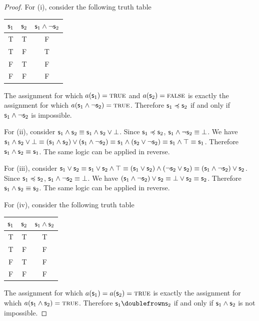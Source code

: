 \documentclass[11pt,letterpaper,fleqn]{memoir} %
\begin{document}
\begin{mathSection}
\begin{proof}
	For (i), consider the following truth table 
\begin{center}
	\begin{tabular}{c|c|c}
		$\mathsf{s}_1$ & $\mathsf{s}_2$ & $\mathsf{s}_1 \wedge \neg \mathsf{s}_2$\\
		\hline
		T & T & F \\
		T & F & T \\
		F & T & F \\
		F & F & F \\
	\end{tabular}
\end{center}
	The assignment for which $a(\mathsf{s}_1) = \textsc{true}$ and $a(\mathsf{s}_2) = \textsc{false}$ is exactly the assignment for which $a(\mathsf{s}_1 \wedge \neg \mathsf{s}_2) = \textsc{true}$. Therefore $\mathsf{s}_1 \preccurlyeq \mathsf{s}_2$ if and only if $\mathsf{s}_1 \wedge \neg \mathsf{s}_2$ is impossible.
	
	For (ii), consider $\mathsf{s}_1 \wedge \mathsf{s}_2 \equiv \mathsf{s}_1 \wedge \mathsf{s}_2 \vee \bot$. Since $\mathsf{s}_1 \preccurlyeq \mathsf{s}_2$, $\mathsf{s}_1 \wedge \neg \mathsf{s}_2 \equiv \bot$. We have $\mathsf{s}_1 \wedge \mathsf{s}_2 \vee \bot \equiv ( \mathsf{s}_1 \wedge \mathsf{s}_2 ) \vee (\mathsf{s}_1 \wedge \neg \mathsf{s}_2) \equiv \mathsf{s}_1 \wedge (\mathsf{s}_2 \vee \neg \mathsf{s}_2) \equiv \mathsf{s}_1 \wedge \top \equiv \mathsf{s}_1$. Therefore $\mathsf{s}_1 \wedge \mathsf{s}_2 \equiv \mathsf{s}_1$. The same logic can be applied in reverse.
	
	For (iii), consider $\mathsf{s}_1 \vee \mathsf{s}_2 \equiv \mathsf{s}_1 \vee \mathsf{s}_2 \wedge \top \equiv (\mathsf{s}_1 \vee \mathsf{s}_2) \wedge (\neg \mathsf{s}_2 \vee \mathsf{s}_2) \equiv (\mathsf{s}_1 \wedge \neg \mathsf{s}_2) \vee \mathsf{s}_2$. Since $\mathsf{s}_1 \preccurlyeq \mathsf{s}_2$, $\mathsf{s}_1 \wedge \neg \mathsf{s}_2 \equiv \bot$. We have $(\mathsf{s}_1 \wedge \neg \mathsf{s}_2) \vee \mathsf{s}_2 \equiv \bot \vee \mathsf{s}_2 \equiv \mathsf{s}_2$. Therefore $\mathsf{s}_1 \wedge \mathsf{s}_2 \equiv \mathsf{s}_2$. The same logic can be applied in reverse.
	
	For (iv), consider the following truth table 
\begin{center}
	\begin{tabular}{c|c|c}
		$\mathsf{s}_1$ & $\mathsf{s}_2$ & $\mathsf{s}_1 \wedge \mathsf{s}_2$\\
		\hline
		T & T & T \\
		T & F & F \\
		F & T & F \\
		F & F & F \\
	\end{tabular}
\end{center}
The assignment for which $a(\mathsf{s}_1) = a(\mathsf{s}_2) = \textsc{true}$ is exactly the assignment for which $a(\mathsf{s}_1 \wedge \mathsf{s}_2) = \textsc{true}$. Therefore $\stmt_1 \comp \stmt_2$ if and only if $\mathsf{s}_1 \wedge \mathsf{s}_2$ is not impossible.


\end{proof}
\end{mathSection}
\end{document}
